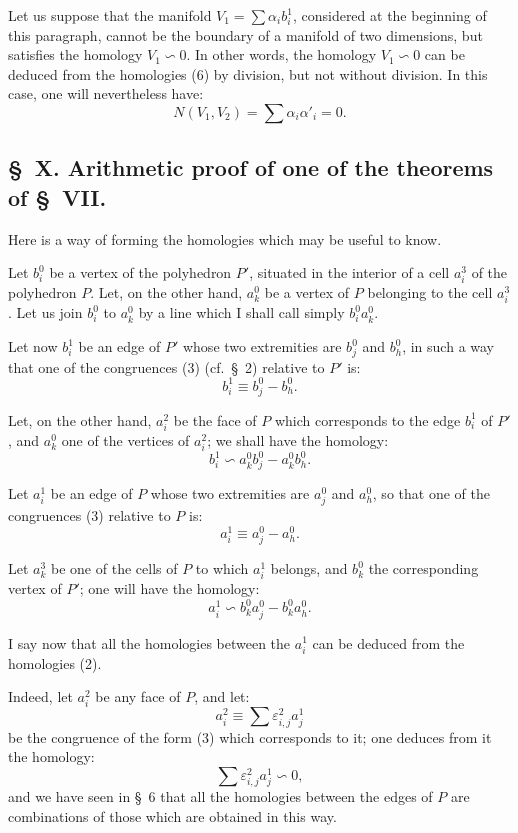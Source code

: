 \documentclass{article}
\begin{document}
Let us suppose that the manifold $V_{1} = \displaystyle\sum \alpha_{i} b^{1}_{i}$, considered at the beginning of this paragraph, cannot be the boundary of a manifold of two dimensions, but satisfies the homology $V_{1} \backsim 0$. In other words, the homology $V_{1} \backsim 0$ can be deduced from the homologies (6) by division, but not without division. In this case, one will nevertheless have:
\[ N(V_{1}, V_{2}) = \sum \alpha_{i} \alpha'_{i} = 0. \]


\subsection*{\S~X. Arithmetic proof of one of the theorems of \S~VII.}

Here is a way of forming the homologies which may be useful to know.

Let $b^{0}_{i}$ be a vertex of the polyhedron $P'$, situated in the interior of a cell $a^{3}_{i}$ of the polyhedron $P$. Let, on the other hand, $a^{0}_{k}$ be a vertex of $P$ belonging to the cell $a^{3}_{i}$. Let us join $b^{0}_{i}$ to $a^{0}_{k}$ by a line which I shall call simply $b^{0}_{i} a^{0}_{k}$.

Let now $b^{1}_{i}$ be an edge of $P'$ whose two extremities are $b^{0}_{j}$ and $b^{0}_{h}$, in such a way that one of the congruences (3) (cf.\ \S~2) relative to $P'$ is:
\[ b^{1}_{i} \equiv b^{0}_{j} - b^{0}_{h}. \]

Let, on the other hand, $a^{2}_{i}$ be the face of $P$ which corresponds to the edge $b^{1}_{i}$ of $P'$, and $a^{0}_{k}$ one of the vertices of $a^{2}_{i}$; we shall have the homology:
\[ b^{1}_{i} \backsim a^{0}_{k} b^{0}_{j} - a^{0}_{k} b^{0}_{h}. \tag{1} \]

Let $a^{1}_{i}$ be an edge of $P$ whose two extremities are $a^{0}_{j}$ and $a^{0}_{h}$, so that one of the congruences (3) relative to $P$ is:
\[ a^{1}_{i} \equiv a^{0}_{j} - a^{0}_{h}. \]

Let $a^{3}_{k}$ be one of the cells of $P$ to which $a^{1}_{i}$ belongs, and $b^{0}_{k}$ the corresponding vertex of $P'$; one will have the homology:
\[ a^{1}_{i} \backsim b^{0}_{k} a^{0}_{j} - b^{0}_{k} a^{0}_{h}. \tag{2} \]

I say now that all the homologies between the $a^{1}_{i}$ can be deduced from the homologies (2).

Indeed, let $a^{2}_{i}$ be any face of $P$, and let:
\[ a^{2}_{i} \equiv \sum \varepsilon^{2}_{i,j} a^{1}_{j} \]
be the congruence of the form (3) which corresponds to it; one deduces from it the homology:
\[ \sum \varepsilon^{2}_{i,j} a^{1}_{j} \backsim 0, \tag{3} \]
and we have seen in \S~6 that all the homologies between the edges of $P$ are combinations of those which are obtained in this way.
\end{document}
